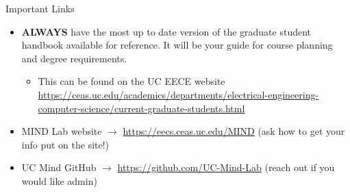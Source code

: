\documentclass[handout]{beamer}
\begin{document}
\begin{frame}{Important Links}
\begin{itemize}
  \item \textbf{ALWAYS} have the most up to date version of the graduate student handbook available for reference. It will be your guide for course planning and degree requirements.
  \begin{itemize}
      \item This can be found on the UC EECE website \url{https://ceas.uc.edu/academics/departments/electrical-engineering-computer-science/current-graduate-students.html}
  \end{itemize}
  \item MIND Lab website $\rightarrow$  \url{https://eecs.ceas.uc.edu/MIND} (ask how to get your info put on the site!)
  \item UC Mind GitHub $\rightarrow$ \url{https://github.com/UC-Mind-Lab} (reach out if you would like admin)
\end{itemize}
\end{frame}




\end{document}
